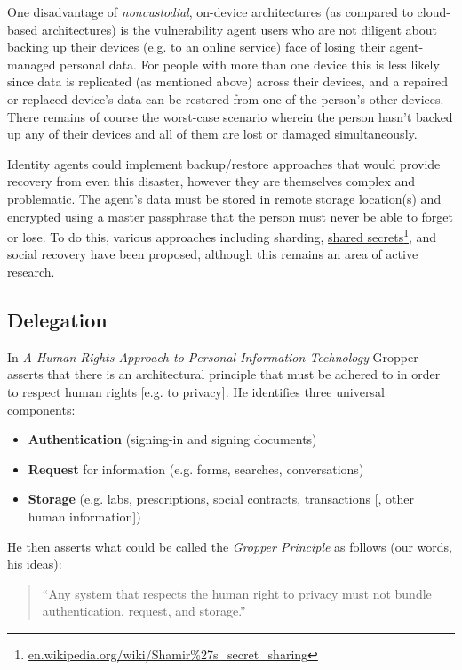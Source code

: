 \documentclass[11pt, oneside]{article}   	%
\newcommand{\hyperfootnote}[1][]{\def\ArgI{{#1}}\hyperfootnoteRelay}
\newcommand\hyperfootnoteRelay[2][]{\href{#1#2}{\ArgI}\footnote{\href{#1#2}{#2}}}
\begin{document}
One disadvantage of \emph{noncustodial}, on-device architectures (as compared to cloud-based architectures) is the vulnerability agent users who are not diligent about backing up their devices (e.g. to an online service) face of losing their agent-managed personal data. For people with more than one device this is less likely since data is replicated (as mentioned above) across their devices, and a repaired or replaced device's data can be restored from one of the person's other devices. There remains of course the worst-case scenario wherein the person hasn't backed up any of their devices and all of them are lost or damaged simultaneously. 

Identity agents could implement backup/restore approaches that would provide recovery from even this disaster, however they are themselves complex and problematic. The agent's data must be stored in remote storage location(s) and encrypted using a master passphrase that the person must never be able to forget or lose. To do this, various approaches including sharding, \hyperfootnote[shared secrets][https://]{en.wikipedia.org/wiki/Shamir\%27s\_secret\_sharing}, and social recovery have been proposed, although this remains an area of active research. 

\subsection{Delegation}

In \emph{A Human Rights Approach to Personal Information Technology}\cite{Gropper2022} Gropper asserts that there is an architectural principle that must be adhered to in order to respect human rights [e.g. to privacy]. He identifies three universal components:

\begin{itemize}
\item \textbf{Authentication} (signing-in and signing documents)
\item \textbf{Request} for information (e.g. forms, searches, conversations)
\item \textbf{Storage} (e.g. labs, prescriptions, social contracts, transactions [, other human information])
\end{itemize}

He then asserts what could be called the \emph{Gropper Principle} as follows (our words, his ideas):
\begin{quote}
``Any system that respects the human right to privacy must not bundle authentication, request, and storage.''
\end{quote}
\end{document}
